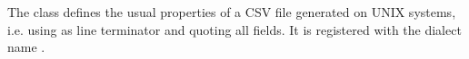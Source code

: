 \documentclass[letterpaper,10pt,english]{sphinxmanual}
\begin{document}

\vspace{5px}

\begin{fulllineitems}
\label{\detokenize{csv:csv.unix_dialect}}
The {\hyperref[\detokenize{csv:csv.unix_dialect}]{}} class defines the usual properties of a CSV file
generated on UNIX systems, i.e. using  as line terminator and quoting
all fields.  It is registered with the dialect name .


\end{fulllineitems}


\vspace{5px}
\end{document}
